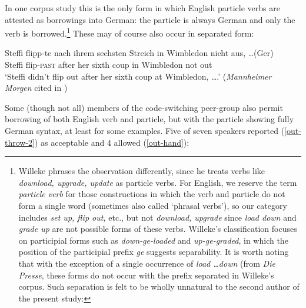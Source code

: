 \documentclass[output=paper]{langscibook}
\begin{document}
In one corpus study \citep{willeke06} this is the only form in which English particle verbs are attested as borrowings into German: the particle is always German and only the verb is borrowed.\footnote{Willeke phrases the observation differently, since he treats verbs like \textit{download, upgrade, update} as particle verbs. For English, we reserve the term \textit{particle verb} for those constructions in which the verb and particle do not form a single word (sometimes also called `phrasal verbs'), so our category includes \textit{set up, flip out,} etc., but not \textit{download, upgrade} since \textit{load down} and \textit{grade up} are not possible forms of these verbs. Willeke's classification focuses on participial forms such as \textit{down-ge-loaded} and \textit{up-ge-graded}, in which the position of the participial prefix \textit{ge} suggests separability. It is worth noting that with the exception of a single occurrence of \textit{load \ldots down} (from \textit{Die Presse}, these forms do not occur with the prefix separated in Willeke's corpus. Such separation is felt to be wholly unnatural to the second author of the present study:

\ea
{}
\z\z

} These may of course also occur in separated form: 

\ea\gll Steffi flipp-te nach ihrem sechsten Streich in Wimbledon nicht aus, \ldots (Ger)\\
Steffi flip-\textsc{past} after her sixth coup in Wimbledon not out\\
\glt `Steffi didn't flip out after her sixth coup at Wimbledon, \ldots.' (\textit{Mannheimer Morgen} cited in \citealp[67]{willeke06})
\z 

Some (though not all) members of the code-switching peer-group also permit borrowing of both English verb and particle, but with the particle showing fully German syntax, at least for some examples. Five of seven speakers reported (\ref{out-throw-2}) as acceptable and 4 allowed (\ref{out-hand}):

\ea\label{part.eng-verb}
\z\z 
\end{document}
